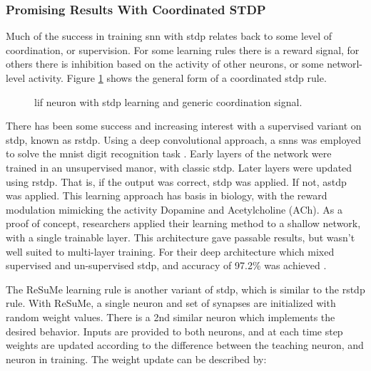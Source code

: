 \documentclass[conference]{IEEEtran}
\newcommand{\afig}[3]{
	\begin{figure}[H]
    	\centering
		\texttt{[image: \#1]}
        \caption{#2.}
        \label{#3}
	\end{figure}
}
\newcommand{\asvgf}[4]{
	\begin{figure}[htbp]
    	\centering
		\adjustbox{max width=#4\linewidth}{}
        \caption{#2.}
        \label{#3}
	\end{figure}
}
\begin{document}
\subsubsection{Promising Results With Coordinated STDP}
Much of the success in training \gls{snn} with \gls{stdp} relates back to some
level of coordination, or supervision. For some learning rules there is a reward
signal, for others there is inhibition based on the activity of other neurons,
or some networl-level activity. Figure \ref{fig:coordinated_stdp} shows the
general form of a coordinated \gls{stdp} rule.

\asvgf{figures/coordinated_stdp.svg}{\gls{lif} neuron with \gls{stdp}
  learning and generic coordination signal}{fig:coordinated_stdp}{0.5}

There has been some success and increasing interest with a supervised variant on
\gls{stdp}, known as \gls{rstdp}. Using a deep convolutional approach, a
\glspl{snn} was employed to solve the \gls{mnist} digit recognition task
\parencite{mozafari_2018}. Early layers of the network were trained in an
unsupervised manor, with classic \gls{stdp}. Later layers were updated using
\gls{rstdp}. That is, if the output was correct, \gls{stdp} was applied. If not,
\gls{astdp} was applied. This learning approach has basis in biology, with the
reward modulation mimicking the activity Dopamine and Acetylcholine (ACh). As a
proof of concept, researchers applied their learning method to a shallow
network, with a single trainable layer. This architecture gave passable results,
but wasn't well suited to multi-layer training. For their deep architecture
which mixed supervised and un-supervised \gls{stdp}, and accuracy of 97.2\% was
achieved \parencite{mozafari_2018}.



The ReSuMe learning rule is another variant of \gls{stdp}, which is similar to
the \gls{rstdp} rule. With ReSuMe, a single neuron and set of synapses are
initialized with random weight values. There is a 2nd similar neuron which
implements the desired behavior. Inputs are provided to both neurons, and at
each time step weights are updated according to the difference between the
teaching neuron, and neuron in training. The weight update can be described by:
\end{document}

